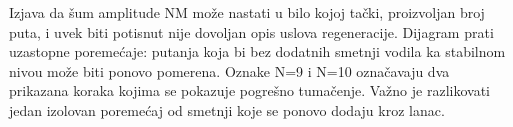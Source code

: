 Izjava da šum amplitude NM može nastati u bilo kojoj tački, proizvoljan broj puta, i uvek biti potisnut nije dovoljan opis uslova regeneracije. Dijagram prati uzastopne poremećaje: putanja koja bi bez dodatnih smetnji vodila ka stabilnom nivou može biti ponovo pomerena. Oznake N=9 i N=10 označavaju dva prikazana koraka kojima se pokazuje pogrešno tumačenje. Važno je razlikovati jedan izolovan poremećaj od smetnji koje se ponovo dodaju kroz lanac.
